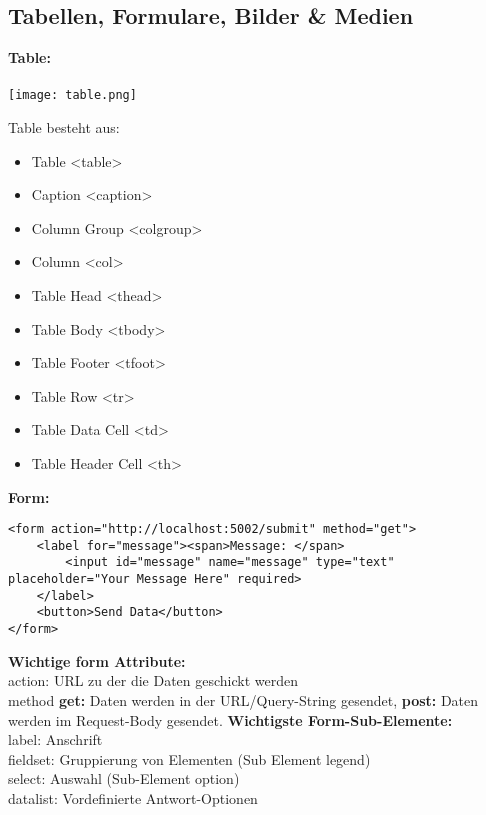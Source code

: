 \documentclass[7pt,landscape,a4paper]{scrartcl}
\begin{document}
\begin{multicols*}{4}
\subsection{Tabellen, Formulare, Bilder \& Medien}
	\begin{minipage}{0.53\linewidth}
		\textcolor{b}{\textbf{Table:}}\\
		\\
		\texttt{[image: table.png]}
	\end{minipage}
	\begin{minipage}{0.48\linewidth}
		Table besteht aus:
		\begin{itemize}[topsep=0pt, leftmargin=3mm]
			\setlength\itemsep{-0.3em}
			\item Table <table>
			\item Caption <caption>
			\item Column Group <colgroup>
			\item Column <col>
			\item Table Head <thead>
			\item Table Body <tbody>
			\item Table Footer <tfoot>
			\item Table Row <tr>
			\item Table Data Cell <td>
			\item Table Header Cell <th>
		\end{itemize}
	\end{minipage}
	\textcolor{b}{\textbf{Form:}}
\begin{lstlisting}[style=htmlcssjs]
<form action="http://localhost:5002/submit" method="get">
	<label for="message"><span>Message: </span>
		<input id="message" name="message" type="text" placeholder="Your Message Here" required>
	</label>
	<button>Send Data</button>
</form>
\end{lstlisting}
	\textbf{Wichtige form Attribute:}\\
	\textcolor{b}{action:} URL zu der die Daten geschickt werden\\
	\textcolor{b}{method} \textbf{get:} Daten werden in der URL/Query-String gesendet, \textbf{post:} Daten werden im Request-Body gesendet.
	\textbf{Wichtigste Form-Sub-Elemente:}\\
	label: Anschrift\\
	fieldset: Gruppierung von Elementen (Sub Element \textcolor{b}{legend})\\
	select: Auswahl (Sub-Element \textcolor{b}{option})\\
	datalist: Vordefinierte Antwort-Optionen\\

\end{multicols*}
\end{document}
